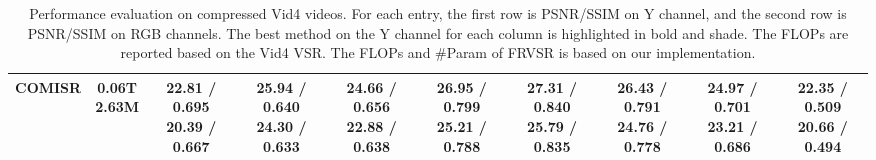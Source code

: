 \begin{table*}[tp]
{\begin{tabular}{l||ccccc||cccc}
 COMISR & \makecell{0.06T \\ 2.63M} & \makecell{\colorbox{shadecolor}{\bf{22.81 / 0.695}}\\20.39 / 0.667} & \makecell{\colorbox{shadecolor}{\bf{25.94 / 0.640}}\\24.30 / 0.633} & \makecell{\colorbox{shadecolor}{\bf{24.66 / 0.656}}\\22.88 / 0.638} & \makecell{\colorbox{shadecolor}{\bf{26.95 / 0.799}}\\25.21 / 0.788} & \makecell{27.31 / 0.840\\25.79 / 0.835} & \makecell{26.43 / 0.791\\24.76 / 0.778} & \makecell{\colorbox{shadecolor}{\bf{24.97 / 0.701}}\\23.21 / 0.686} & \makecell{\colorbox{shadecolor}{\bf{22.35 / 0.509}}\\20.66 / 0.494}   \\ \hline
\end{tabular}
}
\vspace{1mm}
\caption{Performance evaluation on compressed Vid4 videos. 
For each entry, the first row is PSNR/SSIM on Y channel, and the second row is PSNR/SSIM on RGB channels. 
The best method on the Y channel for each column is highlighted in bold and shade. 
The FLOPs are reported based on the Vid4  VSR. The FLOPs and \#Param of FRVSR is based on our implementation.}
\label{tbl:vid4_compare}
\vspace{-2mm}
\end{table*}





